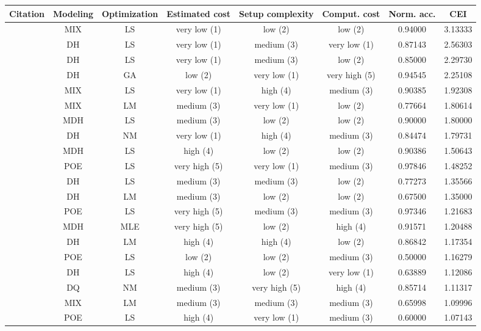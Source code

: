 \begin{tabular}{|c|c|c|c|c|c|c|c|}
\hline
Citation & Modeling & Optimization & Estimated cost & Setup complexity & Comput. cost & Norm. acc. & CEI \\ \hline
[77] & MIX & LS & very low (1) & low (2) & low (2) & 0.94000 & 3.13333 \\ \hline
[71] & DH & LS & very low (1) & medium (3) & very low (1) & 0.87143 & 2.56303 \\ \hline
[69] & DH & LS & very low (1) & medium (3) & low (2) & 0.85000 & 2.29730 \\ \hline
[123] & DH & GA & low (2) & very low (1) & very high (5) & 0.94545 & 2.25108 \\ \hline
[73] & MIX & LS & very low (1) & high (4) & medium (3) & 0.90385 & 1.92308 \\ \hline
[105] & MIX & LM & medium (3) & very low (1) & low (2) & 0.77664 & 1.80614 \\ \hline
[82] & MDH & LS & medium (3) & low (2) & low (2) & 0.90000 & 1.80000 \\ \hline
[70] & DH & NM & very low (1) & high (4) & medium (3) & 0.84474 & 1.79731 \\ \hline
[78] & MDH & LS & high (4) & low (2) & low (2) & 0.90386 & 1.50643 \\ \hline
[22] & POE & LS & very high (5) & very low (1) & medium (3) & 0.97846 & 1.48252 \\ \hline
[100] & DH & LS & medium (3) & medium (3) & low (2) & 0.77273 & 1.35566 \\ \hline
[81] & DH & LM & medium (3) & low (2) & low (2) & 0.67500 & 1.35000 \\ \hline
[19] & POE & LS & very high (5) & medium (3) & medium (3) & 0.97346 & 1.21683 \\ \hline
[111] & MDH & MLE & very high (5) & low (2) & high (4) & 0.91571 & 1.20488 \\ \hline
[101] & DH & LM & high (4) & high (4) & low (2) & 0.86842 & 1.17354 \\ \hline
[20] & POE & LS & low (2) & low (2) & medium (3) & 0.50000 & 1.16279 \\ \hline
[84] & DH & LS & high (4) & low (2) & very low (1) & 0.63889 & 1.12086 \\ \hline
[13] & DQ & NM & medium (3) & very high (5) & high (4) & 0.85714 & 1.11317 \\ \hline
[102] & MIX & LM & medium (3) & medium (3) & medium (3) & 0.65998 & 1.09996 \\ \hline
[21] & POE & LS & high (4) & very low (1) & medium (3) & 0.60000 & 1.07143 \\ \hline

\end{tabular}
